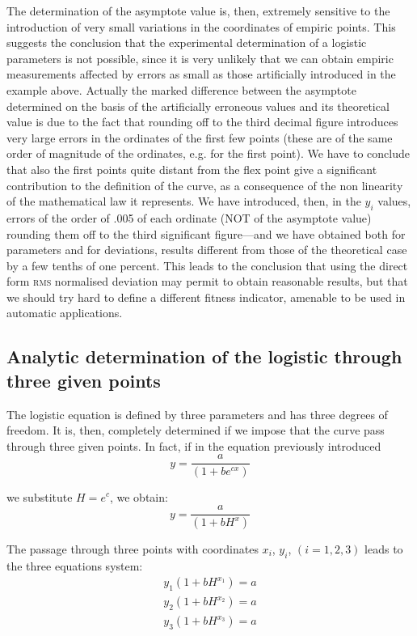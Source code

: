 \documentclass[%
 aip,
 jmp,%
 amsmath,amssymb,
 reprint,%
]{revtex4-1}
\begin{document}
The determination of the asymptote value is, then, extremely sensitive to the introduction of very small variations  in the  coordinates of empiric points. This suggests the conclusion that the experimental determination of a logistic parameters is not possible, since it is very unlikely that we can obtain empiric measurements affected by errors as small as those artificially introduced in the example above.
Actually the marked difference between the asymptote determined on the basis of the artificially erroneous values and its theoretical value is due to the fact that rounding off to the third decimal figure introduces very large errors in the ordinates of the first few points (these are of the same order of magnitude of the ordinates, e.g. for the first point). We have to conclude that also the first points quite distant from the flex point give a significant contribution to the definition of the curve, as a consequence of the non linearity of the mathematical law  it represents.
We have introduced, then, in the $y_i$ values, errors of the order of .005 of each ordinate (NOT of the asymptote value) rounding them off to the third significant figure---and we have obtained both for parameters and for deviations, results different from those of the theoretical case by a few tenths of one percent.
This leads to the conclusion that using the direct form \textsc{rms} normalised deviation may permit to obtain reasonable results, but  that we  should try hard to define a different fitness indicator, amenable to be used in automatic applications.


\subsection{\label{sec:level2}Analytic determination of the logistic through three given points}

The logistic equation is defined by three parameters and has three degrees of freedom. It is, then, completely determined if we impose that the curve pass through three given points. In fact, if in the equation previously introduced \[y = \frac{a}{(1 + be^{cx})}\]

we substitute $H = e^c$, we obtain: \[ y = \frac{a}{(1 + b H^x)} \]
		
The passage through three points with coordinates $x_i$, $y_i$, $(i = 1, 2, 3)$ leads to the three equations system:
\begin{eqnarray}
y_1 (1 + b H^{x_1}) = a \\
y_2 (1 + b H^{x_2}) = a \\
y_3 (1 + b H^{x_3}) = a 
\end{eqnarray}
\end{document}
